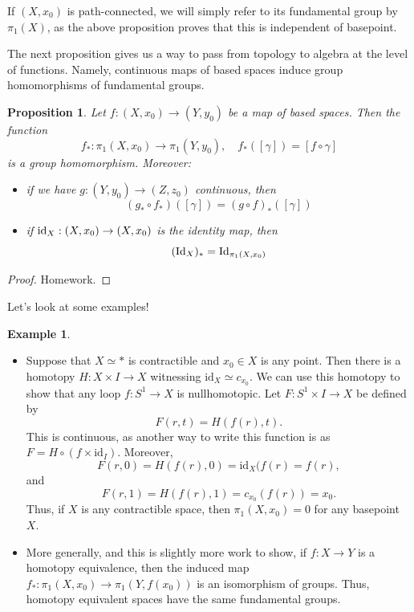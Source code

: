 \documentclass[10pt]{amsart}
\newtheorem{proposition}[thm]{Proposition}
\theoremstyle{definition}
\newtheorem{ex}[thm]{Example}
\begin{document}
If $(X, x_0)$ is path-connected, we will simply refer to its fundamental group by $\pi_1(X)$, as the above proposition proves that this is independent of basepoint. 

The next proposition gives us a way to pass from topology to algebra at the level of functions. Namely, continuous maps of based spaces induce group homomorphisms of fundamental groups.

\begin{proposition}
    Let $f:(X, x_0) \to (Y, y_0)$ be a map of based spaces. Then the function
    \[f_*:\pi_1(X, x_0) \to \pi_1(Y, y_0), \quad f_*([\gamma]) = [f \circ \gamma]\]
    is a group homomorphism. Moreover:
    \begin{itemize}
        \item if we have $g:(Y, y_0) \to (Z, z_0)$ continuous, then
        \[(g_* \circ f_*)([\gamma]) = (g \circ f)_*([\gamma])\]
        \item if $\textup{id}_X:(X, x_0) \to (X, x_0)$ is the identity map, then
        \[(\textup{Id}_X)_* = \textup{Id}_{\pi_1(X, x_0)}\]
    \end{itemize}
\end{proposition}

\begin{proof}
    Homework.
\end{proof}

Let's look at some examples!
\begin{ex}
    \hfill
    \begin{itemize}
        \item Suppose that $X \simeq *$ is contractible and $x_0 \in X$ is any point. Then there is a homotopy $H:X \times I \to X$ witnessing $\text{id}_X \simeq c_{x_0}$. We can use this homotopy to show that any loop $f:S^1 \to X$ is nullhomotopic. Let $F:S^1 \times I \to X$ be defined by
        \[F(r, t) = H(f(r), t).\]
        This is continuous, as another way to write this function is as $F = H \circ (f \times \text{id}_I)$. Moreover, 
        \[
        F(r,0) = H(f(r), 0) = \text{id}_X(f(r) = f(r),
        \]
        and 
        \[
        F(r, 1) = H(f(r), 1) = c_{x_0}(f(r)) = x_0.
        \]
        Thus, if $X$ is any contractible space, then $\pi_1(X, x_0) = 0$ for any basepoint $X$.

        \item More generally, and this is slightly more work to show, if $f:X \to Y$ is a homotopy equivalence, then the induced map $f_*:\pi_1(X, x_0) \to \pi_1(Y, f(x_0))$ is an isomorphism of groups. Thus, homotopy equivalent spaces have the same fundamental groups.
    \end{itemize}
\end{ex}
\end{document}

